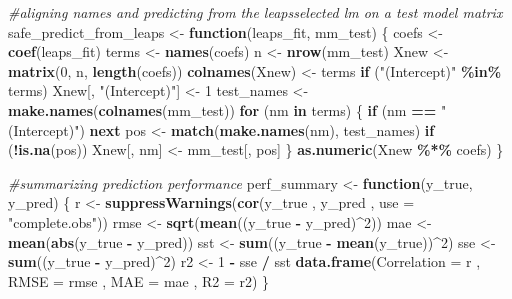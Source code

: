 \documentclass[
]{article}
\newenvironment{Shaded}{\begin{snugshade}}{\end{snugshade}}
\newcommand{\AttributeTok}[1]{\textcolor[rgb]{0.13,0.29,0.53}{#1}}
\newcommand{\CommentTok}[1]{\textcolor[rgb]{0.56,0.35,0.01}{\textit{#1}}}
\newcommand{\ControlFlowTok}[1]{\textcolor[rgb]{0.13,0.29,0.53}{\textbf{#1}}}
\newcommand{\DecValTok}[1]{\textcolor[rgb]{0.00,0.00,0.81}{#1}}
\newcommand{\FunctionTok}[1]{\textcolor[rgb]{0.13,0.29,0.53}{\textbf{#1}}}
\newcommand{\NormalTok}[1]{#1}
\newcommand{\OtherTok}[1]{\textcolor[rgb]{0.56,0.35,0.01}{#1}}
\newcommand{\SpecialCharTok}[1]{\textcolor[rgb]{0.81,0.36,0.00}{\textbf{#1}}}
\newcommand{\StringTok}[1]{\textcolor[rgb]{0.31,0.60,0.02}{#1}}
\begin{document}
\begin{Shaded}
\begin{Highlighting}[]
\CommentTok{\#aligning names and predicting from the leapsselected lm on a test model matrix}
\NormalTok{safe\_predict\_from\_leaps }\OtherTok{\textless{}{-}} \ControlFlowTok{function}\NormalTok{(leaps\_fit, mm\_test)}
\NormalTok{\{}
\NormalTok{  coefs }\OtherTok{\textless{}{-}} \FunctionTok{coef}\NormalTok{(leaps\_fit)}
\NormalTok{  terms }\OtherTok{\textless{}{-}} \FunctionTok{names}\NormalTok{(coefs)}
\NormalTok{  n }\OtherTok{\textless{}{-}} \FunctionTok{nrow}\NormalTok{(mm\_test)}
\NormalTok{  Xnew }\OtherTok{\textless{}{-}} \FunctionTok{matrix}\NormalTok{(}\DecValTok{0}\NormalTok{, n, }\FunctionTok{length}\NormalTok{(coefs))}
  \FunctionTok{colnames}\NormalTok{(Xnew) }\OtherTok{\textless{}{-}}\NormalTok{ terms}
  \ControlFlowTok{if}\NormalTok{ (}\StringTok{"(Intercept)"} \SpecialCharTok{\%in\%}\NormalTok{ terms) Xnew[, }\StringTok{"(Intercept)"}\NormalTok{] }\OtherTok{\textless{}{-}} \DecValTok{1}
\NormalTok{  test\_names }\OtherTok{\textless{}{-}} \FunctionTok{make.names}\NormalTok{(}\FunctionTok{colnames}\NormalTok{(mm\_test))}
  \ControlFlowTok{for}\NormalTok{ (nm }\ControlFlowTok{in}\NormalTok{ terms)}
\NormalTok{  \{}
    \ControlFlowTok{if}\NormalTok{ (nm }\SpecialCharTok{==} \StringTok{"(Intercept)"}\NormalTok{) }\ControlFlowTok{next}
\NormalTok{    pos }\OtherTok{\textless{}{-}} \FunctionTok{match}\NormalTok{(}\FunctionTok{make.names}\NormalTok{(nm), test\_names)}
    \ControlFlowTok{if}\NormalTok{ (}\SpecialCharTok{!}\FunctionTok{is.na}\NormalTok{(pos)) Xnew[, nm] }\OtherTok{\textless{}{-}}\NormalTok{ mm\_test[, pos]}
\NormalTok{  \}}
  \FunctionTok{as.numeric}\NormalTok{(Xnew }\SpecialCharTok{\%*\%}\NormalTok{ coefs)}
\NormalTok{\}}

\CommentTok{\#summarizing prediction performance}
\NormalTok{perf\_summary }\OtherTok{\textless{}{-}} \ControlFlowTok{function}\NormalTok{(y\_true, y\_pred)}
\NormalTok{\{}
\NormalTok{  r }\OtherTok{\textless{}{-}} \FunctionTok{suppressWarnings}\NormalTok{(}\FunctionTok{cor}\NormalTok{(y\_true , y\_pred , }\AttributeTok{use =} \StringTok{"complete.obs"}\NormalTok{))}
\NormalTok{  rmse }\OtherTok{\textless{}{-}} \FunctionTok{sqrt}\NormalTok{(}\FunctionTok{mean}\NormalTok{((y\_true }\SpecialCharTok{{-}}\NormalTok{ y\_pred)}\SpecialCharTok{\^{}}\DecValTok{2}\NormalTok{))}
\NormalTok{  mae }\OtherTok{\textless{}{-}} \FunctionTok{mean}\NormalTok{(}\FunctionTok{abs}\NormalTok{(y\_true }\SpecialCharTok{{-}}\NormalTok{ y\_pred))}
\NormalTok{  sst }\OtherTok{\textless{}{-}} \FunctionTok{sum}\NormalTok{((y\_true }\SpecialCharTok{{-}} \FunctionTok{mean}\NormalTok{(y\_true))}\SpecialCharTok{\^{}}\DecValTok{2}\NormalTok{)}
\NormalTok{  sse }\OtherTok{\textless{}{-}} \FunctionTok{sum}\NormalTok{((y\_true }\SpecialCharTok{{-}}\NormalTok{ y\_pred)}\SpecialCharTok{\^{}}\DecValTok{2}\NormalTok{)}
\NormalTok{  r2 }\OtherTok{\textless{}{-}} \DecValTok{1} \SpecialCharTok{{-}}\NormalTok{ sse }\SpecialCharTok{/}\NormalTok{ sst}
  \FunctionTok{data.frame}\NormalTok{(}\AttributeTok{Correlation =}\NormalTok{ r , }\AttributeTok{RMSE =}\NormalTok{ rmse , }\AttributeTok{MAE =}\NormalTok{ mae , }\AttributeTok{R2 =}\NormalTok{ r2)}
\NormalTok{\}}



\end{Highlighting}
\end{Shaded}
\end{document}
